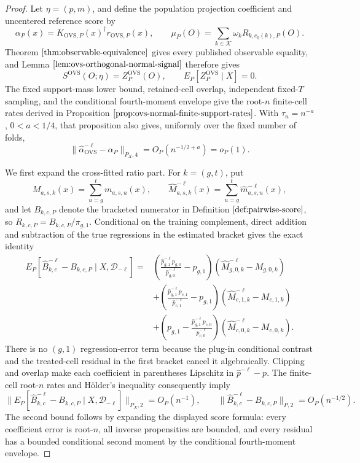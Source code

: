 \documentclass{article}
\begin{document}
\begin{proof}
Let \(\eta=(p,m)\), and define the population projection coefficient and uncentered reference score by
\[
\alpha_P(x)=K_{\mathrm{OVS},P}(x)^\dagger r_{\mathrm{OVS},P}(x),
\qquad
\mu_P(O)=\sum_{k\in\mathcal K}\omega_k R_{k,c_0(k),P}(O).
\tag{41a}
\]
Theorem \(\ref{thm:observable-equivalence}\) gives every published observable equality, and Lemma \(\ref{lem:ovs-orthogonal-normal-signal}\) therefore gives
\[
S^{\mathrm{OVS}}(O;\eta)=Z_P^{\mathrm{OVS}}(O),
\qquad E_P[Z_P^{\mathrm{OVS}}\mid X]=0.
\tag{41b}
\]
The fixed support-mass lower bound, retained-cell overlap, independent fixed-\(T\) sampling, and the conditional fourth-moment envelope give the root-\(n\) finite-cell rates derived in Proposition \(\ref{prop:ovs-normal-finite-support-rates}\).  With \(\tau_n=n^{-a}\), \(0<a<1/4\), that proposition also gives, uniformly over the fixed number of folds,
\[
\|\widehat\alpha_{\mathrm{OVS}}^{-\ell}-\alpha_P\|_{P_X,4}
=O_P(n^{-1/2+a})=o_P(1).
\tag{41c}
\]

We first expand the cross-fitted ratio part.  For \(k=(g,t)\), put
\[
M_{a,s,k}(x)=\sum_{u=g}^t m_{a,s,u}(x),
\qquad
\widehat M_{a,s,k}^{-\ell}(x)=\sum_{u=g}^t\widehat m_{a,s,u}^{-\ell}(x),
\]
and let \(B_{k,c,P}\) denote the bracketed numerator in Definition \(\ref{def:pairwise-score}\), so \(R_{k,c,P}=B_{k,c,P}/\pi_{g,1}\).  Conditional on the training complement, direct addition and subtraction of the true regressions in the estimated bracket gives the exact identity
\[
\begin{aligned}
E_P[\widehat B_{k,c}^{-\ell}-B_{k,c,P}\mid X,\mathcal D_{-\ell}]
={}&\left(\frac{\widehat p_{g,1}^{-\ell}p_{g,0}}{\widehat p_{g,0}^{-\ell}}-p_{g,1}\right)
(\widehat M_{g,0,k}^{-\ell}-M_{g,0,k})\\
&+\left(\frac{\widehat p_{g,1}^{-\ell}p_{c,1}}{\widehat p_{c,1}^{-\ell}}-p_{g,1}\right)
(\widehat M_{c,1,k}^{-\ell}-M_{c,1,k})\\
&+\left(p_{g,1}-\frac{\widehat p_{g,1}^{-\ell}p_{c,0}}{\widehat p_{c,0}^{-\ell}}\right)
(\widehat M_{c,0,k}^{-\ell}-M_{c,0,k}).
\end{aligned}
\tag{41d}
\]
There is no \((g,1)\) regression-error term because the plug-in conditional contrast and the treated-cell residual in the first bracket cancel it algebraically.  Clipping and overlap make each coefficient in parentheses Lipschitz in \(\widehat p^{-\ell}-p\).  The finite-cell root-\(n\) rates and H\"older's inequality consequently imply
\[
\|E_P[\widehat B_{k,c}^{-\ell}-B_{k,c,P}\mid X,\mathcal D_{-\ell}]\|_{P_X,2}
=O_P(n^{-1}),
\qquad
\|\widehat B_{k,c}^{-\ell}-B_{k,c,P}\|_{P,2}=O_P(n^{-1/2}).
\tag{41e}
\]
The second bound follows by expanding the displayed score formula: every coefficient error is root-\(n\), all inverse propensities are bounded, and every residual has a bounded conditional second moment by the conditional fourth-moment envelope.


\end{proof}
\end{document}
